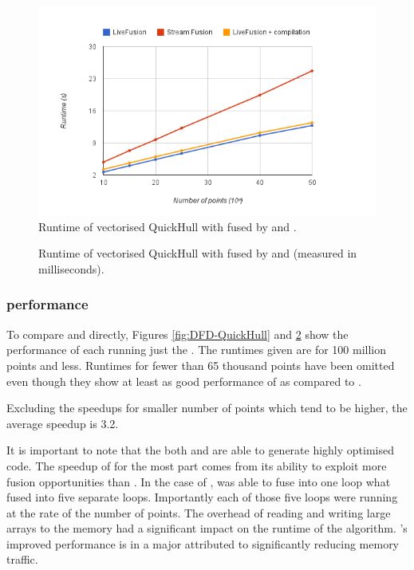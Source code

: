 \documentclass[preamble.tex]{subfiles}
\begin{document}
\begin{figure}
\includegraphics[center]{img/Eval-QuickHull}
\caption{Runtime of vectorised QuickHull with \FilterMax fused by \StreamFusion and \LiveFusion.}
\label{fig:Eval-QuickHull}
\end{figure}


\begin{figure}
\caption{Runtime of vectorised QuickHull with \FilterMax fused by \StreamFusion and \LiveFusion (measured in milliseconds).}
\label{fig:Eval-QuickHull-numbers}
\end{figure}


\subsubsection{\FilterMax performance}

To compare \LiveFusion and \StreamFusion directly, Figures \ref{fig:DFD-QuickHull} and \ref{fig:Eval-QuickHull-numbers} show the performance of each running just the \FilterMax. The runtimes given are for 100 million points and less. Runtimes for fewer than 65 thousand points have been omitted even though they show at least as good performance of \LiveFusion as compared to \StreamFusion.

Excluding the speedups for smaller number of points which tend to be higher, the average speedup is 3.2.

It is important to note that the both \LiveFusion and \StreamFusion are able to generate highly optimised code. The speedup of \LiveFusion for the most part comes from its ability to exploit more fusion opportunities than \StreamFusion. In the case of \FilterMax, \LiveFusion was able to fuse into one loop what \StreamFusion fused into five separate loops. Importantly each of those five loops were running at the rate of the number of points. The overhead of reading and writing large arrays to the memory had a significant impact on the runtime of the algorithm. \LiveFusion's improved performance is in a major attributed to significantly reducing memory traffic.
\end{document}
